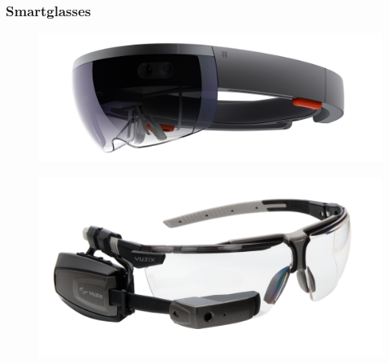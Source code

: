 \begin{frame}\frametitle{Smartglasses}
\begin{figure}
	\includegraphics[height=.3\textheight]{images/HoloLens}
\end{figure}
\begin{figure}
	\includegraphics[height=.3\textheight]{images/VuzixM100}
\end{figure}
\end{frame}

